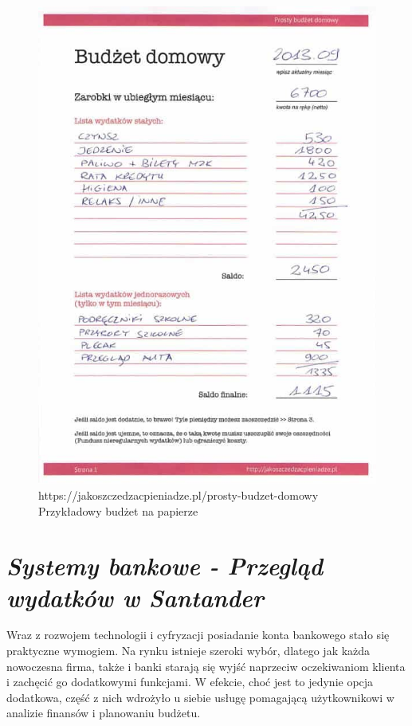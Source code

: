 \documentclass[a4paper,10pt, twoside]{report}
\newcommand{\customstylesection}[1]{\textbf{\textit{#1}}}
\begin{document}
\begin{large}
\begin{figure}[H]           %
    \centering
    \includegraphics[width=12cm]{figures/jakoszczedzacpieniadze.pl_budzet-domowy-1.jpg}
    \caption{https://jakoszczedzacpieniadze.pl/prosty-budzet-domowy Przykładowy budżet na papierze}
    \label{fig:budzetprzykladowypapier}
\end{figure}

\section{\customstylesection{Systemy bankowe - Przegląd wydatków w Santander}}
{Wraz z rozwojem technologii i cyfryzacji posiadanie konta bankowego stało się 
praktyczne wymogiem. Na rynku istnieje szeroki wybór, dlatego jak każda 
nowoczesna firma, także i banki starają się wyjść naprzeciw oczekiwaniom 
klienta i zachęcić go dodatkowymi funkcjami. W efekcie, choć jest to jedynie 
opcja dodatkowa, część z nich wdrożyło u siebie usługę pomagającą użytkownikowi 
w analizie finansów i planowaniu budżetu.}


\end{large}
\end{document}
